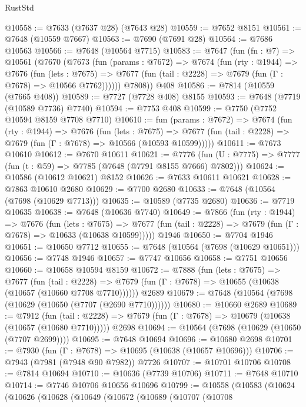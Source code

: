 \begin{lexlean}{RustStd}
\begin{coremodule}
{\begin{coremodule}
{{{{{{{{{{{{{{{{{{{{{{{{{{{{{{{{{{{{{{{{{{{{{{{{{{{{{@10558 := @7633 (@7637 @28) (@7643 @28)
@10559 := @7652 @8151
@10561 := @7648 (@10559 @7667)
@10563 := @7690 (@7691 @28)
@10564 := @7686 @10563
@10566 := @7648 (@10564 @7715)
@10583 := @7647
    (fun (fn : @7) =>
    @10561
      (@7670
        (@7673
          (fun (params : @7672) =>
          @7674
            (fun (rty : @1944) =>
            @7676
              (fun (lets : @7675) =>
              @7677 (fun (tail : @2228) => @7679 (fun (Γ : @7678) => @10566 @7762))))))
        @7808))
    @408
@10586 := @7814 (@10559 (@7665 @408))
@10589 := @7727 (@7728 @408) @8155
@10593 := @7648 (@7719 (@10589 @7736) @7740)
@10594 := @7753 @408
@10599 := @7750 (@7752 @10594 @8159 @7708 @7710)
@10610 := fun (params : @7672) =>
  @7674
    (fun (rty : @1944) =>
    @7676
      (fun (lets : @7675) =>
      @7677 (fun (tail : @2228) => @7679 (fun (Γ : @7678) => @10566 (@10593 @10599)))))
@10611 := @7673 @10610
@10612 := @7670 @10611
@10621 := @7776
    (fun (U : @7775) => @7777 (fun (t : @59) => @7785 (@7648 (@7791 @8155 @7666) @7802)))
@10624 := @10586 (@10612 @10621) @8152
@10626 := @7633 @10611 @10621
@10628 := @7863 @10610 @2680
@10629 := @7700 @2680
@10633 := @7648 (@10564 (@7698 (@10629 @7713)))
@10635 := @10589 (@7735 @2680)
@10636 := @7719 @10635
@10638 := @7648 (@10636 @7740)
@10649 := @7866
    (fun (rty : @1944) =>
    @7676
      (fun (lets : @7675) =>
      @7677 (fun (tail : @2228) => @7679 (fun (Γ : @7678) => @10633 (@10638 @10599)))))
    @1946
@10650 := @7704 @1946
@10651 := @10650 @7712
@10655 := @7648 (@10564 (@7698 (@10629 @10651)))
@10656 := @7748 @1946
@10657 := @7747 @10656
@10658 := @7751 @10656
@10660 := @10658 @10594 @8159
@10672 := @7888
    (fun (lets : @7675) =>
    @7677
      (fun (tail : @2228) =>
      @7679 (fun (Γ : @7678) => @10655 (@10638 (@10657 (@10660 @7708 @7710))))))
    @2689
@10679 := @7648 (@10564 (@7698 (@10629 (@10650 (@7707 (@2690 @7710))))))
@10680 := @10660 @2689
@10689 := @7912
    (fun (tail : @2228) => @7679 (fun (Γ : @7678) => @10679 (@10638 (@10657 (@10680 @7710)))))
    @2698
@10694 := @10564 (@7698 (@10629 (@10650 (@7707 @2699))))
@10695 := @7648 @10694
@10696 := @10680 @2698
@10701 := @7930 (fun (Γ : @7678) => @10695 (@10638 (@10657 @10696)))
@10706 := @7943 (@7981 (@7948 @90 @7982)) @7726
@10707 := @10701 @10706
@10708 := @7814 @10694
@10710 := @10636 (@7739 @10706)
@10711 := @7648 @10710
@10714 := @7746 @10706 @10656 @10696
@10799 := @10558
    (@10583
      (@10624
        (@10626
          (@10628
            (@10649
              (@10672
                (@10689
                  (@10707
                    (@10708
}}}}}}}}}}}}}}}}}}}}}}}}}}}}}}}}}}}}}}}}}}}}}}}}}}}}}
\end{coremodule}}
\end{coremodule}
\end{lexlean}
